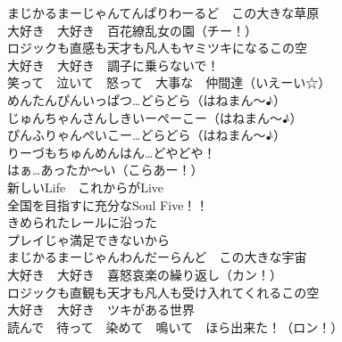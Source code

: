 {まじかるまーじゃんてんぱりわーるど　この大きな草原\\
大好き　大好き　百花繚乱女の園（チー！）\\
ロジックも直感も天才も凡人もヤミツキになるこの空\\
大好き　大好き　調子に乗らないで！\\
笑って　泣いて　怒って　大事な　仲間達（いえーい☆）\\

めんたんぴんいっぱつ…どらどら（はねまん〜♪）\\
じゅんちゃんさんしきいーぺーこー（はねまん〜♪）\\
ぴんふりゃんぺいこー…どらどら（はねまん〜♪）\\
りーづもちゅんめんはん…どやどや！\\
はぁ…あったか〜い（こらあー！）\\

新しいLife　これからがLive\\
全国を目指すに充分なSoul Five！！\\
きめられたレールに沿った\\
プレイじゃ満足できないから\\

まじかるまーじゃんわんだーらんど　この大きな宇宙\\
大好き　大好き　喜怒哀楽の繰り返し（カン！）\\
ロジックも直観も天才も凡人も受け入れてくれるこの空\\
大好き　大好き　ツキがある世界\\
読んで　待って　染めて　鳴いて　ほら出来た！（ロン！）
}

